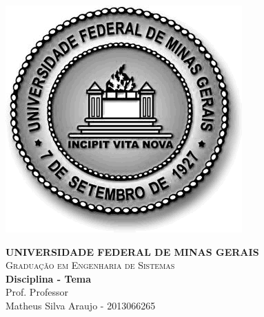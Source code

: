 \documentclass[10pt,a4paper]{article}
\begin{document}

	\begin{minipage}[b]{0.05\linewidth}
			\includegraphics[scale=0.3]{ufmg}
	\end{minipage}
	\hfill
	\begin{minipage}[b]{0.95\linewidth}
		\begin{flushright}
			\textbf{UNIVERSIDADE FEDERAL DE MINAS GERAIS} \\
			\textsc{Graduação em Engenharia de Sistemas} \\
			\textbf{Disciplina - Tema} \\
			Prof. Professor \\
			Matheus Silva Araujo - 2013066265
		\end{flushright}
	\end{minipage}

	\begin{center}
		\hrulefill
	\end{center}

\end{document}
